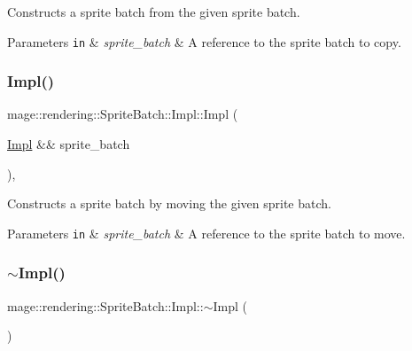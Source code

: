 Constructs a sprite batch from the given sprite batch.


\begin{DoxyParams}[1]{Parameters}
\mbox{\tt in}  & {\em sprite\+\_\+batch} & A reference to the sprite batch to copy. \\
\hline
\end{DoxyParams}
\mbox{\label{classmage_1_1rendering_1_1_sprite_batch_1_1_impl_a0f9d79fb3a897c1365f5e15a1eaf01f9}} 
\subsubsection{\texorpdfstring{Impl()}{Impl()}\hspace{0.1cm}{\footnotesize\ttfamily [3/3]}}
{\footnotesize\ttfamily mage\+::rendering\+::\+Sprite\+Batch\+::\+Impl\+::\+Impl (\begin{DoxyParamCaption}\item[{\mbox{\hyperlink{classmage_1_1rendering_1_1_sprite_batch_1_1_impl}{Impl}} \&\&}]{sprite\+\_\+batch }\end{DoxyParamCaption})\hspace{0.3cm}{\ttfamily [default]}, {\ttfamily [noexcept]}}

Constructs a sprite batch by moving the given sprite batch.


\begin{DoxyParams}[1]{Parameters}
\mbox{\tt in}  & {\em sprite\+\_\+batch} & A reference to the sprite batch to move. \\
\hline
\end{DoxyParams}
\mbox{\label{classmage_1_1rendering_1_1_sprite_batch_1_1_impl_a32ea1f2a4d1f11c19594e1d4eaa36f6c}} 
\subsubsection{\texorpdfstring{$\sim$\+Impl()}{~Impl()}}
{\footnotesize\ttfamily mage\+::rendering\+::\+Sprite\+Batch\+::\+Impl\+::$\sim$\+Impl (\begin{DoxyParamCaption}{ }\end{DoxyParamCaption})\hspace{0.3cm}{\ttfamily [default]}}

